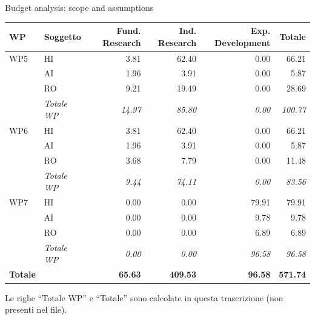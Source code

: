 \documentclass[aspectratio=169,11pt]{beamer}
\begin{document}
\begin{frame}{Budget analysis: scope and assumptions}


\begin{table}[H]\centering\scriptsize
\begin{tabular}{llrrrr}\toprule\textbf{WP} & \textbf{Soggetto} & \textbf{Fund. Research} & \textbf{Ind. Research} & \textbf{Exp. Development} & \textbf{Totale} \\\midrule
WP5 & HI & 3.81 & 62.40 & 0.00 & 66.21 \\
 & AI & 1.96 & 3.91 & 0.00 & 5.87 \\
 & RO & 9.21 & 19.49 & 0.00 & 28.69 \\
 & \textit{Totale WP} & \textit{14.97} & \textit{85.80} & \textit{0.00} & \textit{100.77} \\\midrule
WP6 & HI & 3.81 & 62.40 & 0.00 & 66.21 \\
 & AI & 1.96 & 3.91 & 0.00 & 5.87 \\
 & RO & 3.68 & 7.79 & 0.00 & 11.48 \\
 & \textit{Totale WP} & \textit{9.44} & \textit{74.11} & \textit{0.00} & \textit{83.56} \\\midrule
WP7 & HI & 0.00 & 0.00 & 79.91 & 79.91 \\
 & AI & 0.00 & 0.00 & 9.78 & 9.78 \\
 & RO & 0.00 & 0.00 & 6.89 & 6.89 \\
 & \textit{Totale WP} & \textit{0.00} & \textit{0.00} & \textit{96.58} & \textit{96.58} \\
\midrule\textbf{Totale} & & \textbf{65.63} & \textbf{409.53} & \textbf{96.58} & \textbf{571.74} \\
\bottomrule\end{tabular}
\par\smallskip\footnotesize Le righe ``Totale WP'' e ``Totale'' sono calcolate in questa trascrizione (non presenti nel file).
\end{table}

\end{frame}
\end{document}
